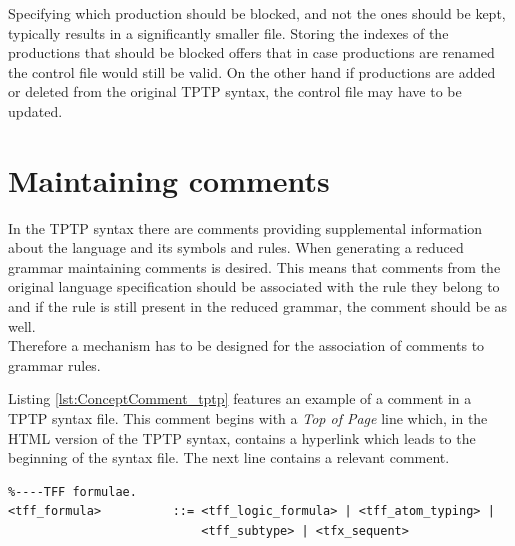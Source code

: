 Specifying which production should be blocked, and not the ones should be kept, typically results in a significantly smaller file.
Storing the indexes of the productions that should be blocked offers that in case productions are renamed the control file would still be valid. On the other hand if productions are added or deleted from the original \ac{TPTP} syntax, the control file may have to be updated.

\section{Maintaining comments}\label{sec:ConceptMaintainingComments}
In the \ac{TPTP} syntax there are comments providing supplemental information about the language and its symbols and rules.
When generating a reduced grammar maintaining comments is desired. This means that comments from the original language specification should be associated with the rule they belong to and if the rule is still present in the reduced grammar, the comment should be as well.\\
Therefore a mechanism has to be designed for the association of comments to grammar rules.

Listing \ref{lst:ConceptComment_tptp} features an example of a comment in a \ac{TPTP} syntax file. This comment begins with a \textit{Top of Page} line which, in the HTML version of the \ac{TPTP} syntax, contains a hyperlink which leads to the beginning of the syntax file.
The next line contains a relevant comment.\\
\begin{lstlisting}[language=none, basicstyle=\scriptsize	,caption= Comment in the \ac{TPTP} syntax,label= lst:ConceptComment_tptp]
%----Top of Page---------------------------------------------------------------
%----TFF formulae.
<tff_formula>          ::= <tff_logic_formula> | <tff_atom_typing> |
                           <tff_subtype> | <tfx_sequent>
\end{lstlisting}

